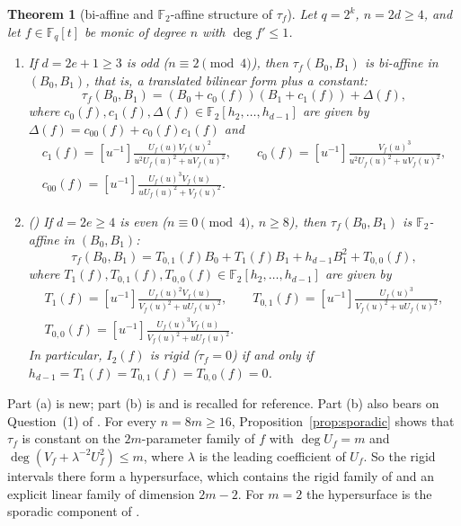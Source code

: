 \documentclass[11pt,a4paper]{amsart}
\newtheorem{theorem}{Theorem}[section]
\theoremstyle{remark}
\numberwithin{equation}{section}
\newcommand{\Fq}{\mathbb{F}_q}
\newcommand{\Ftwo}{\mathbb{F}_2}
\begin{document}
\begin{theorem}[bi-affine and $\Ftwo$-affine structure of $\tau_f$]\label{thm:structure}
Let $q=2^k$, $n=2d\ge 4$, and let $f\in\Fq[t]$ be monic of degree $n$ with $\deg f'\le 1$.
\begin{enumerate}
\item[(a)] If $d=2e+1\ge 3$ is odd ($n\equiv 2\pmod 4$), then $\tau_f(B_0,B_1)$ is bi-affine in $(B_0,B_1)$, that is, a translated bilinear form plus a constant:
\begin{equation}\label{eq:tau-odd}
\tau_f(B_0,B_1)=(B_0+c_0(f))(B_1+c_1(f))+\Delta(f),
\end{equation}
where $c_0(f),c_1(f),\Delta(f)\in\Ftwo[h_2,\dots,h_{d-1}]$ are given by $\Delta(f)=c_{00}(f)+c_0(f)c_1(f)$ and
\begin{gather*}
c_1(f)=[u^{-1}]\frac{U_f(u)V_f(u)^2}{u^2U_f(u)^2+uV_f(u)^2},\qquad
c_0(f)=[u^{-1}]\frac{V_f(u)^3}{u^2U_f(u)^2+uV_f(u)^2},\\
c_{00}(f)=[u^{-1}]\frac{U_f(u)^3V_f(u)}{uU_f(u)^2+V_f(u)^2}.
\end{gather*}
\item[(b)] \textup{(\cite[Theorem~3.2(b)]{ChenShort})} If $d=2e\ge 4$ is even ($n\equiv 0\pmod 4$, $n\ge 8$),
then $\tau_f(B_0,B_1)$ is $\Ftwo$-affine in $(B_0,B_1)$:
\begin{equation}\label{eq:tau-even}
\tau_f(B_0,B_1)=T_{0,1}(f)B_0+T_1(f)B_1+h_{d-1}B_1^2+T_{0,0}(f),
\end{equation}
where $T_1(f),T_{0,1}(f),T_{0,0}(f)\in\Ftwo[h_2,\dots,h_{d-1}]$ are given by
\begin{gather*}
T_1(f)=[u^{-1}]\frac{U_f(u)^2V_f(u)}{V_f(u)^2+uU_f(u)^2},\qquad
T_{0,1}(f)=[u^{-1}]\frac{U_f(u)^3}{V_f(u)^2+uU_f(u)^2},\\
T_{0,0}(f)=[u^{-1}]\frac{U_f(u)^3V_f(u)}{V_f(u)^2+uU_f(u)^2}.
\end{gather*}
In particular, $I_2(f)$ is rigid ($\tau_f=0$) if and only if $h_{d-1}=T_1(f)=T_{0,1}(f)=T_{0,0}(f)=0$.
\end{enumerate}
\end{theorem}

Part (a) is new; part (b) is \cite[Theorem~3.2(b)]{ChenShort} and is recalled for reference. Part (b) also bears on
Question~(1) of \cite{ChenShort}. For every $n=8m\ge 16$, Proposition~\ref{prop:sporadic} shows that $\tau_f$ is
constant on the $2m$-parameter family of $f$ with $\deg U_f=m$ and $\deg(V_f+\lambda^{-2}U_f^2)\le m$, where
$\lambda$ is the leading coefficient of $U_f$. So the rigid intervals there form a hypersurface, which contains the
rigid family of \cite[Proposition~3.3]{ChenShort} and an explicit linear family of dimension $2m-2$. For $m=2$ the
hypersurface is the sporadic component of \cite[Table~1]{ChenShort}.
\end{document}
